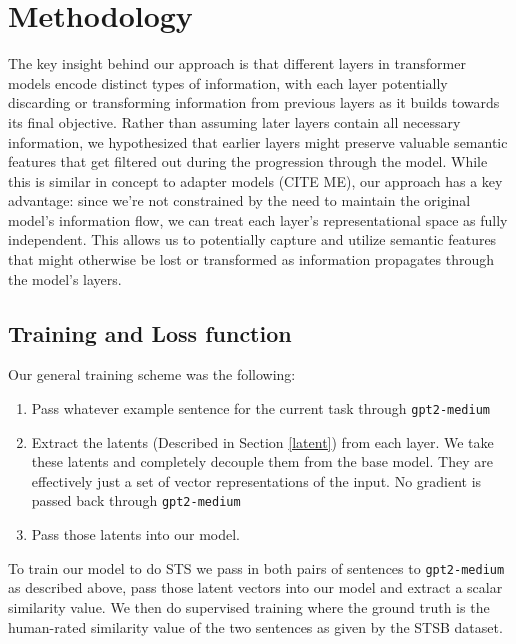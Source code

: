 \documentclass[14pt]{article}
\begin{document}

\section{Methodology}
The key insight behind our approach is that different layers in transformer models encode distinct types of information, with each layer potentially discarding or transforming information from previous layers as it builds towards its final objective. Rather than assuming later layers contain all necessary information, we hypothesized that earlier layers might preserve valuable semantic features that get filtered out during the progression through the model. While this is similar in concept to adapter models (CITE ME), our approach has a key advantage: since we're not constrained by the need to maintain the original model's information flow, we can treat each layer's representational space as fully independent. This allows us to potentially capture and utilize semantic features that might otherwise be lost or transformed as information propagates through the model's layers.

\subsection{Training and Loss function} \label{Loss} \label{Training}
Our general training scheme was the following:
\begin{enumerate}
    \item Pass whatever example sentence for the current task through \verb|gpt2-medium|
    \item Extract the latents (Described in Section \ref{latent}) from each layer. We take these latents and completely decouple them from the base model. They are effectively just a set of vector representations of the input. No gradient is passed back through \verb|gpt2-medium|
    \item Pass those latents into our model.
\end{enumerate}
To train our model to do STS we pass in both pairs of sentences to \verb|gpt2-medium| as described above, pass those latent vectors into our model and extract a scalar similarity value. We then do supervised training where the ground truth is the human-rated similarity value of the two sentences as given by the STSB dataset.
\end{document}
